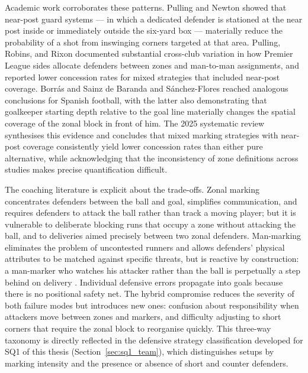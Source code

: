 Academic work corroborates these patterns. Pulling and Newton
\cite{PullingNewton2017} showed that near-post guard systems --- in which
a dedicated defender is stationed at the near post inside or immediately outside
the six-yard box --- materially reduce the probability of a shot from inswinging
corners targeted at that area. Pulling, Robins, and Rixon
\cite{Pulling2013} documented substantial cross-club variation in how
Premier League sides allocate defenders between zones and man-to-man assignments,
and reported lower concession rates for mixed strategies that included near-post
coverage. Borr\'as and Sainz de Baranda \cite{Borras2005} and
S\'anchez-Flores \cite{SanchezFlores2012} reached analogous conclusions
for Spanish football, with the latter also demonstrating that goalkeeper starting
depth relative to the goal line materially changes the spatial coverage of the
zonal block in front of him. The 2025 systematic review \citep{MDPI2025}
synthesises this evidence and concludes that mixed marking strategies with
near-post coverage consistently yield lower concession rates than either pure
alternative, while acknowledging that the inconsistency of zone definitions
across studies makes precise quantification difficult.

The coaching literature is explicit about the trade-offs. Zonal marking
concentrates defenders between the ball and goal, simplifies communication, and
requires defenders to attack the ball rather than track a moving player;
but it is vulnerable to deliberate blocking runs that occupy a zone without
attacking the ball, and to deliveries aimed precisely between two zonal
defenders. Man-marking eliminates the problem of uncontested runners and allows
defenders' physical attributes to be matched against specific threats, but is
reactive by construction: a man-marker who watches his attacker rather
than the ball is perpetually a step behind on delivery \citep{TacticalAnalyst2016}.
Individual defensive errors propagate into goals because there is no positional
safety net. The hybrid compromise reduces the severity of both failure modes but
introduces new ones: confusion about responsibility when attackers move between
zones and markers, and difficulty adjusting to short corners that require the
zonal block to reorganise quickly. This three-way taxonomy is directly reflected
in the defensive strategy classification developed for SQ1 of this thesis
(Section~\ref{sec:sq1_team}), which distinguishes setups by marking intensity
and the presence or absence of short and counter defenders.

